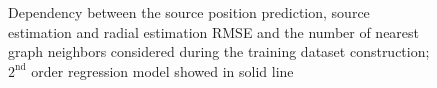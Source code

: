 \documentclass[applsci,article,submit,moreauthors,pdftex]{Definitions/mdpi}
\begin{document}
\begin{figure}[h!]
	\centering
	\caption{Dependency between the source position prediction, source \doa{} estimation  and radial estimation RMSE and the number of nearest graph neighbors considered during the training dataset construction; $ 2^{\mathrm{nd}} $ order regression model showed in solid line}
	\label{fig:rmsengnbrs}
\end{figure}
\end{document}
